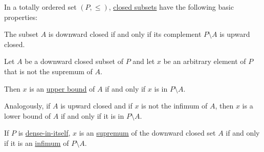 \begin{proposition}\label{thm:def:closed_ordered_subset}
  In a totally ordered set \( (P, \leq) \), \hyperref[def:closed_ordered_subset]{closed subsets} have the following basic properties:
  \begin{thmenum}
     The subset \( A \) is downward closed if and only if its complement \( P \setminus A \) is upward closed.

     Let \( A \) be a downward closed subset of \( P \) and let \( x \) be an arbitrary element of \( P \) that is not the supremum of \( A \).

    Then \( x \) is an \hyperref[def:extremal_points/bounds]{upper bound} of \( A \) if and only if \( x \) is in \( P \setminus A \).

    Analogously, if \( A \) is upward closed and if \( x \) is not the infimum of \( A \), then \( x \) is a lower bound of \( A \) if and only if it is in \( P \setminus A \).

     If \( P \) is \hyperref[def:dense_total_order]{dense-in-itself}, \( x \) is an \hyperref[def:extremal_points/supremum_and_infimum]{supremum} of the downward closed set \( A \) if and only if it is an \hyperref[def:extremal_points/supremum_and_infimum]{infimum} of \( P \setminus A \).
  \end{thmenum}
\end{proposition}
